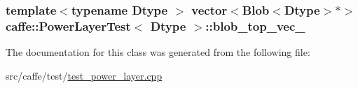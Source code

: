 \hypertarget{classcaffe_1_1_power_layer_test_a65b1b90a4491e98872084d504c53fed1}{
\subsubsection[{blob\+\_\+top\+\_\+vec\+\_\+}]{\setlength{\rightskip}{0pt plus 5cm}template$<$typename Dtype $>$ vector$<${\bf Blob}$<$Dtype$>$$\ast$$>$ {\bf caffe\+::\+Power\+Layer\+Test}$<$ Dtype $>$\+::blob\+\_\+top\+\_\+vec\+\_\+\hspace{0.3cm}{\ttfamily [protected]}}}\label{classcaffe_1_1_power_layer_test_a65b1b90a4491e98872084d504c53fed1}


The documentation for this class was generated from the following file\+:\begin{DoxyCompactItemize}
\item 
src/caffe/test/\hyperlink{test__power__layer_8cpp}{test\+\_\+power\+\_\+layer.\+cpp}\end{DoxyCompactItemize}
